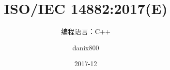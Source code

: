 \documentclass[cn,11pt,fancy,hide,normal]{elegantbook}
\title{ISO/IEC 14882:2017(E) }
\subtitle{编程语言：C++}
\author{danix800}
\institute{ISO/IEC}
\date{2017-12}
\begin{document}
\maketitle
\tableofcontents


\mainmatter
\hypersetup{pageanchor=true}

\renewcommand{\theparagraph}{\arabic{paragraph}}
\renewcommand{\thefigure}{\arabic{figure}}
\renewcommand{\thetable}{\arabic{table}}
\newcommand{\qdbl}{\textquotedbl}
\newcommand{\qsgl}{\textquotesingle}
\newcommand{\bslh}{\textbackslash}





















\end{document}
